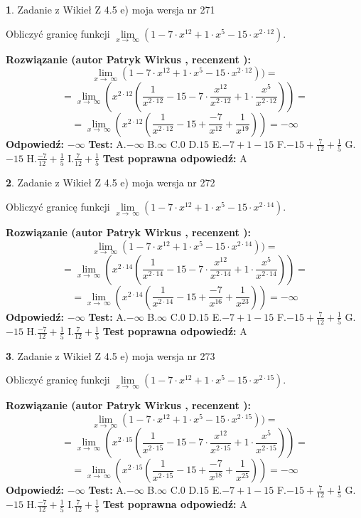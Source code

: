 \documentclass[12pt, a4paper]{article}
\theoremstyle{definition} %
\newtheorem{zad}{}
\newcommand{\zadStart}[1]{\begin{zad}#1\newline}
\newcommand{\zadStop}{\end{zad}}
\newcommand{\rozwStart}[2]{\noindent \textbf{Rozwiązanie (autor #1 , recenzent #2): }\newline}
\newcommand{\rozwStop}{\newline}
\newcommand{\odpStart}{\noindent \textbf{Odpowiedź:}\newline}
\newcommand{\odpStop}{\newline}
\newcommand{\testStart}{\noindent \textbf{Test:}\newline}
\newcommand{\testStop}{\newline}
\newcommand{\kluczStart}{\noindent \textbf{Test poprawna odpowiedź:}\newline}
\newcommand{\kluczStop}{\newline}
\begin{document}
\zadStart{Zadanie z Wikieł Z 4.5 e) moja wersja nr 271}



Obliczyć granicę funkcji  $\lim\limits_{x\to\ \infty}(1 - 7 \cdot x^{12}+1 \cdot x^{5}- 15 \cdot x^{2\cdot12})$.
\zadStop
\rozwStart{Patryk Wirkus}{}
$$\lim\limits_{x\to\ \infty}(1 - 7 \cdot x^{12}+1 \cdot x^{5}- 15 \cdot x^{2\cdot12}))=$$
$$=\lim\limits_{x\to\ \infty}(x^{2\cdot12}(\frac{1}{x^{2\cdot12}}-15 -7 \cdot \frac{x^{12}}{x^{2\cdot12}}+1 \cdot \frac{x^{5}}{x^{2\cdot12}}))=$$
$$=\lim\limits_{x\to\ \infty}(x^{2\cdot12}(\frac{1}{x^{2\cdot12}}-15 + \frac{-7}{x^{12}}+ \frac{1}{x^{19}}))=-\infty$$
\rozwStop
\odpStart
$-\infty$
\odpStop
\testStart
A.$-\infty$ B.$\infty$ C.$0$ D.$15$ E.$-7 + 1 - 15$
F.$-15+\frac{7}{12}+\frac{1}{5}$ G.$-15$
H.$\frac{-7}{12}+\frac{1}{5}$
I.$\frac{7}{12}+\frac{1}{5}$
\testStop
\kluczStart
A
\kluczStop



\zadStart{Zadanie z Wikieł Z 4.5 e) moja wersja nr 272}



Obliczyć granicę funkcji  $\lim\limits_{x\to\ \infty}(1 - 7 \cdot x^{12}+1 \cdot x^{5}- 15 \cdot x^{2\cdot14})$.
\zadStop
\rozwStart{Patryk Wirkus}{}
$$\lim\limits_{x\to\ \infty}(1 - 7 \cdot x^{12}+1 \cdot x^{5}- 15 \cdot x^{2\cdot14}))=$$
$$=\lim\limits_{x\to\ \infty}(x^{2\cdot14}(\frac{1}{x^{2\cdot14}}-15 -7 \cdot \frac{x^{12}}{x^{2\cdot14}}+1 \cdot \frac{x^{5}}{x^{2\cdot14}}))=$$
$$=\lim\limits_{x\to\ \infty}(x^{2\cdot14}(\frac{1}{x^{2\cdot14}}-15 + \frac{-7}{x^{16}}+ \frac{1}{x^{23}}))=-\infty$$
\rozwStop
\odpStart
$-\infty$
\odpStop
\testStart
A.$-\infty$ B.$\infty$ C.$0$ D.$15$ E.$-7 + 1 - 15$
F.$-15+\frac{7}{12}+\frac{1}{5}$ G.$-15$
H.$\frac{-7}{12}+\frac{1}{5}$
I.$\frac{7}{12}+\frac{1}{5}$
\testStop
\kluczStart
A
\kluczStop



\zadStart{Zadanie z Wikieł Z 4.5 e) moja wersja nr 273}



Obliczyć granicę funkcji  $\lim\limits_{x\to\ \infty}(1 - 7 \cdot x^{12}+1 \cdot x^{5}- 15 \cdot x^{2\cdot15})$.
\zadStop
\rozwStart{Patryk Wirkus}{}
$$\lim\limits_{x\to\ \infty}(1 - 7 \cdot x^{12}+1 \cdot x^{5}- 15 \cdot x^{2\cdot15}))=$$
$$=\lim\limits_{x\to\ \infty}(x^{2\cdot15}(\frac{1}{x^{2\cdot15}}-15 -7 \cdot \frac{x^{12}}{x^{2\cdot15}}+1 \cdot \frac{x^{5}}{x^{2\cdot15}}))=$$
$$=\lim\limits_{x\to\ \infty}(x^{2\cdot15}(\frac{1}{x^{2\cdot15}}-15 + \frac{-7}{x^{18}}+ \frac{1}{x^{25}}))=-\infty$$
\rozwStop
\odpStart
$-\infty$
\odpStop
\testStart
A.$-\infty$ B.$\infty$ C.$0$ D.$15$ E.$-7 + 1 - 15$
F.$-15+\frac{7}{12}+\frac{1}{5}$ G.$-15$
H.$\frac{-7}{12}+\frac{1}{5}$
I.$\frac{7}{12}+\frac{1}{5}$
\testStop
\kluczStart
A
\kluczStop
\end{document}
